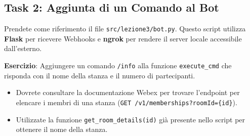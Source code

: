 \documentclass[11pt,a4paper]{article}
\begin{document}
\subsection{Task 2: Aggiunta di un Comando al Bot}
Prendete come riferimento il file \texttt{src/lezione3/bot.py}. Questo script utilizza \textbf{Flask} per ricevere Webhooks e \textbf{ngrok} per rendere il server locale accessibile dall'esterno.

\textbf{Esercizio}: Aggiungere un comando \texttt{/info} alla funzione \texttt{execute\_cmd} che risponda con il nome della stanza e il numero di partecipanti.
\begin{itemize}
    \item Dovrete consultare la documentazione Webex per trovare l'endpoint per elencare i membri di una stanza (\texttt{GET /v1/memberships?roomId=\{id\}}).
    \item Utilizzate la funzione \texttt{get\_room\_details(id)} già presente nello script per ottenere il nome della stanza.
\end{itemize}
\end{document}
